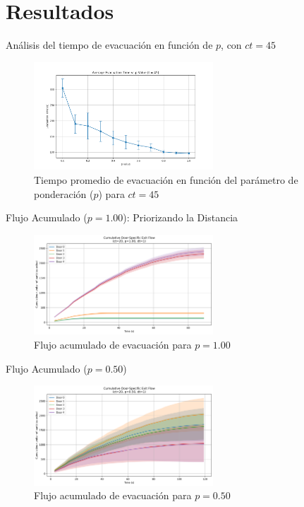 \documentclass[aspectratio=169]{beamer}
\begin{document}
\section{Resultados}

\begin{frame}{Análisis del tiempo de evacuación en función de $p$, con $ct=45$}
    \begin{figure}
        \centering
        \includegraphics[width=0.60\textwidth]{img/evacuation_times_t_45.png}
        \caption{Tiempo promedio de evacuación en función del parámetro de ponderación ($p$) para $ct=45$}
    \end{figure}
\end{frame}

\begin{frame}{Flujo Acumulado ($p=1.00$): Priorizando la Distancia}
    \begin{figure}
        \centering
        \includegraphics[width=0.6\textwidth]{img/cumulative_door_flows_t_20_&_p_1.00.png}
        \caption{Flujo acumulado de evacuación para $p=1.00$}
    \end{figure}
\end{frame}

\begin{frame}{Flujo Acumulado ($p=0.50$)}
    \begin{figure}
        \centering
        \includegraphics[width=0.6\textwidth]{img/cumulative_door_flows_t_20_&_p_0.50.png}
        \caption{Flujo acumulado de evacuación para $p=0.50$}
    \end{figure}
\end{frame}
\end{document}
